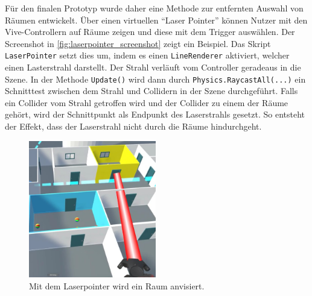 Für den finalen Prototyp wurde daher eine Methode zur entfernten Auswahl von Räumen entwickelt.
Über einen virtuellen \enquote{Laser Pointer} können Nutzer mit den Vive-Controllern auf Räume zeigen und diese mit dem Trigger auswählen.
Der Screenshot in \autoref{fig:laserpointer_screenshot} zeigt ein Beispiel.
Das Skript \lstinline|LaserPointer| setzt dies um, indem es einen \lstinline|LineRenderer| aktiviert, welcher einen Lasterstrahl darstellt.
Der Strahl verläuft vom Controller geradeaus in die Szene.
In der Methode \lstinline|Update()| wird dann durch \lstinline|Physics.RaycastAll(...)| ein Schnitttest zwischen dem Strahl und Collidern in der Szene durchgeführt.
Falls ein Collider vom Strahl getroffen wird und der Collider zu einem der Räume gehört, wird der Schnittpunkt als Endpunkt des Laserstrahls gesetzt.
So entsteht der Effekt, dass der Laserstrahl nicht durch die Räume hindurchgeht.
\begin{figure}[htb]
    \centering
    \includegraphics[height=6cm]{figures/screenshots/laserpointer}
    \caption{Mit dem Laserpointer wird ein Raum anvisiert.}
    \label{fig:laserpointer_screenshot}    
\end{figure}

